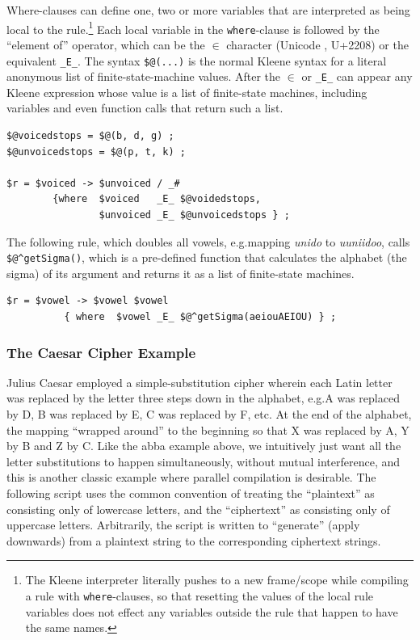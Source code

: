 Where-clauses can define one, two or more variables that are interpreted as being
local to the rule.\footnote{The Kleene interpreter literally pushes to a new
	frame/scope while compiling a rule with \texttt{where}-clauses, so that resetting the
values of the local rule variables does not effect any variables outside the rule
that happen to have the same names.}  Each local variable in the \texttt{where}-clause is
followed by the ``element of'' operator, which can be the $\in$ character
(Unicode , U+2208) or the  equivalent \verb!_E_!.  The
syntax \verb!$@(...)! is the normal Kleene syntax for a literal anonymous list of
finite-state-machine values.  After the $\in$ or \verb!_E_! can appear any Kleene
expression whose value is a list of finite-state machines, including variables
and even function calls that return such a list.

\begin{samepage}
\begin{Verbatim}
$@voicedstops = $@(b, d, g) ;
$@unvoicedstops = $@(p, t, k) ;

$r = $voiced -> $unvoiced / _#  
        {where  $voiced   _E_ $@voidedstops, 
                $unvoiced _E_ $@unvoicedstops } ;
\end{Verbatim}
\end{samepage}

\noindent
The following rule, which doubles all vowels, e.g.\@ mapping \emph{unido} to
\emph{uuniidoo}, calls \verb!$@^getSigma()!, which is a pre-defined function that
calculates the alphabet (the sigma) of its
argument and returns it as a list of finite-state machines.

\begin{Verbatim}
$r = $vowel -> $vowel $vowel 
          { where  $vowel _E_ $@^getSigma(aeiouAEIOU) } ;
\end{Verbatim}

\subsubsection{The Caesar Cipher Example}

Julius Caesar employed a simple-substitution cipher wherein each Latin letter was replaced by the letter three steps down
in the alphabet, e.g.\@ A was replaced by D, B was replaced by E, C was replaced by F, etc.  At the end of the alphabet,
the mapping ``wrapped around'' to the beginning so that X was replaced by A, Y by B and Z by C.  Like the abba example
above, we intuitively just want all the letter substitutions to happen simultaneously, without mutual interference, and
this is another classic example where parallel compilation is desirable.  The following script uses the common convention
of treating the ``plaintext'' as consisting only of lowercase letters, and the ``ciphertext'' as consisting only of uppercase
letters.  Arbitrarily, the script is written to ``generate'' (apply downwards) from a plaintext string to the
corresponding ciphertext strings.


